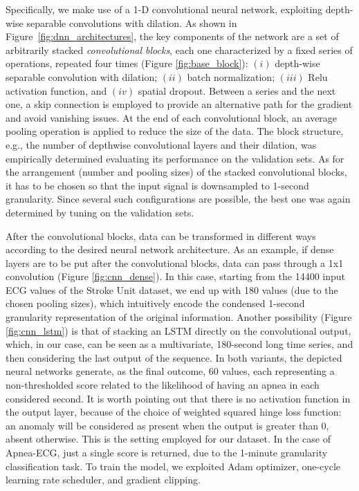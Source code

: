 \documentclass[5p,twocolumn,lefttitle]{elsarticle}
\begin{document}
Specifically, we make use of a \mbox{1-D} convolutional neural network, exploiting depth-wise separable convolutions with dilation. 
As shown in Figure~\ref{fig:dnn_architectures}, the key components of the network are a set of arbitrarily stacked \emph{convolutional blocks}, each one characterized by a fixed series of operations, repeated four times (Figure \ref{fig:base_block}): $(i)$ depth-wise separable convolution with dilation; $(ii)$  batch normalization; $(iii)$ Relu activation function, and $(iv)$ spatial dropout. Between a series and the next one, a skip connection is employed to provide an alternative path for the gradient and avoid vanishing issues. At the end of each convolutional block, an average pooling operation is applied to reduce the size of the data. The block structure, e.g., the number of depthwise convolutional layers and their dilation, was empirically determined evaluating its performance on the validation sets. 
As for the arrangement (number and pooling sizes) of the stacked convolutional blocks, it has to be chosen so that the input signal is downsampled to 1-second granularity. Since several such configurations are possible, the best one was again determined by tuning on the validation sets.

After the convolutional blocks, data can be transformed in different ways according to the desired neural network architecture. As an example, if dense layers are to be put after the convolutional blocks, data can pass through a 1x1 convolution (Figure \ref{fig:cnn_dense}). In this case, starting from the 14400 input ECG values of the Stroke Unit dataset, we end up with 180 values (due to the chosen pooling sizes), which intuitively encode the condensed 1-second granularity representation of the original information. Another possibility (Figure \ref{fig:cnn_lstm}) is that of stacking an LSTM directly on the convolutional output, which, in our case, can be seen as a multivariate, 180-second long time series, and then considering the last output of the sequence. 
In both variants, the depicted neural networks generate, as the final outcome, 60 values, each representing a non-thresholded score related to the likelihood of having an apnea in each considered second. It is worth pointing out that there is no activation function in the output layer, because of the choice of weighted squared hinge loss function: an anomaly will be considered as present when the output is greater than 0, absent otherwise. This is the setting employed for our dataset. In the case of Apnea-ECG, just a single score is returned, due to the 1-minute granularity classification task. To train the model, we exploited Adam optimizer, one-cycle learning rate scheduler, and gradient clipping. 
\end{document}
